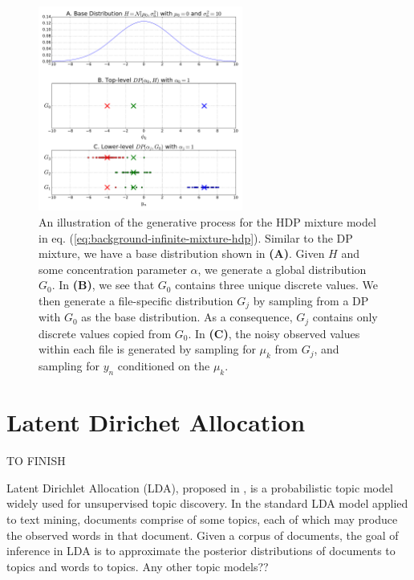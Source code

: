 \begin{figure}
\noindent \begin{centering}
\includegraphics[width=0.6\textwidth]{03-machine-learning/figures/hdp_samples.pdf}
\par\end{centering}
\caption{\label{fig:g-from-hdp}An illustration of the generative process for the HDP mixture model in eq. (\ref{eq:background-infinite-mixture-hdp}). Similar to the DP mixture, we have a base distribution shown in \textbf{(A)}. Given $H$ and some concentration parameter $\alpha$, we generate a global distribution $G_0$. In \textbf{(B)}, we see that $G_0$ contains three unique discrete values. We then generate a file-specific distribution $G_j$ by sampling from a DP with $G_0$ as the base distribution. As a consequence, $G_j$ contains only discrete values copied from $G_0$. In \textbf{(C)}, the noisy observed values within each file is generated by sampling for $\mu_k$ from $G_j$, and sampling for $y_n$ conditioned on the $\mu_k$.}
\end{figure}

\section{Latent Dirichet Allocation\label{background-lda}}

TO FINISH

Latent Dirichlet Allocation (LDA), proposed in \cite{Blei2003}, is a probabilistic topic model widely used for unsupervised topic discovery. In the standard LDA model applied to text mining, documents comprise of some topics, each of which may produce the observed words in that document. Given a corpus of documents, the goal of inference in LDA is to approximate the posterior distributions of documents to topics and words to topics. Any other topic models??

